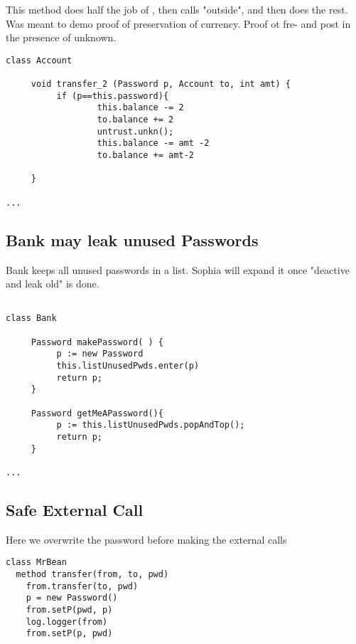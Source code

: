 This method  does half the job of  , then calls "outside", and then does the rest. Was meant to demo proof of preservation of currency. Proof ot fre- and post in the presence of unknown.

\begin{lstlisting}[language=chainmail, mathescape=true, frame=lines]
class Account

     void transfer_2 (Password p, Account to, int amt) {
          if (p==this.password){
                  this.balance -= 2
                  to.balance += 2
                  untrust.unkn();
                  this.balance -= amt -2
                  to.balance += amt-2
                     
     }
     
...
\end{lstlisting}

\subsection{Bank may leak unused Passwords}
\label{s:deactivate_leak_old}

Bank keeps all unused passwords in a list.  Sophia will expand it once "deactive and leak old" is done.

\begin{lstlisting}[language=chainmail, mathescape=true, frame=lines]

class Bank

     Password makePassword( ) {
          p := new Password
          this.listUnusedPwds.enter(p) 
          return p;                    
     }
     
     Password getMeAPassword(){
          p := this.listUnusedPwds.popAndTop();
          return p;
     }
     
...
\end{lstlisting}

\subsection{Safe External Call}
\label{s:safe:extern}

Here we overwrite the password before making the external calls

\begin{lstlisting}[language=chainmail, mathescape=true, frame=lines]
class MrBean
  method transfer(from, to, pwd)
    from.transfer(to, pwd)
    p = new Password()
    from.setP(pwd, p)
    log.logger(from)
    from.setP(p, pwd)
\end{lstlisting}


